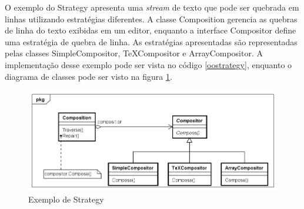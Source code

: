 O exemplo do Strategy apresenta uma \textit{stream} 
de texto que pode ser quebrada em linhas utilizando 
estratégias diferentes. A classe Composition 
gerencia as quebras de linha do texto exibidas em 
um editor, enquanto a interface Compositor define 
uma estratégia de quebra de linha. As estratégias 
apresentadas são representadas pelas classes 
SimpleCompositor, TeXCompositor e ArrayCompositor. 
A implementação desse exemplo pode ser vista no código 
\ref{oostrategy}, enquanto o diagrama de classes pode 
ser visto na figura \ref{strategy_exemplo}.

\begin{figure}[htb]
	\caption{\label{strategy_exemplo}Exemplo de Strategy}
	\begin{center}
	    \includegraphics[scale=0.5]{5_padroes-contexto-funcional/5.3_comportamentais/5.3.09_strategy/strategy_exemplo.png}
	\end{center}
\end{figure}

